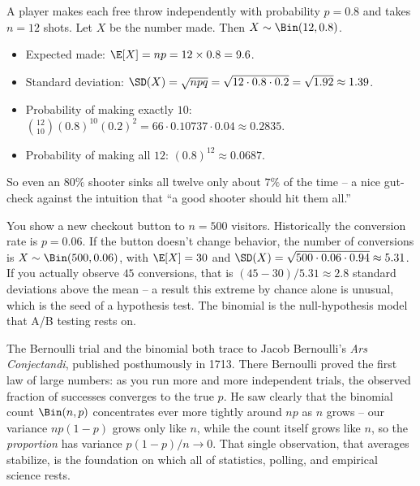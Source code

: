 \begin{example}
\label{ch07:ex-freethrows}
A player makes each free throw independently with probability $p = 0.8$ and takes
$n = 12$ shots. Let $X$ be the number made. Then $X \sim \Bin(12, 0.8)$.
\begin{itemize}
\item Expected made: $\E[X] = np = 12 \times 0.8 = 9.6$.
\item Standard deviation: $\SD(X) = \sqrt{npq} = \sqrt{12 \cdot 0.8 \cdot 0.2}
  = \sqrt{1.92} \approx 1.39$.
\item Probability of making exactly $10$:
  $\binom{12}{10}(0.8)^{10}(0.2)^{2} = 66 \cdot 0.10737 \cdot 0.04
  \approx 0.2835$.
\item Probability of making all $12$: $(0.8)^{12} \approx 0.0687$.
\end{itemize}
So even an $80\%$ shooter sinks all twelve only about $7\%$ of the time -- a nice
gut-check against the intuition that ``a good shooter should hit them all.''
\end{example}

\begin{example}
\label{ch07:ex-abtest}
You show a new checkout button to $n = 500$ visitors. Historically the conversion
rate is $p = 0.06$. If the button doesn't change behavior, the number of
conversions is $X \sim \Bin(500, 0.06)$, with $\E[X] = 30$ and
$\SD(X) = \sqrt{500 \cdot 0.06 \cdot 0.94} \approx 5.31$. If you actually observe
$45$ conversions, that is
$(45 - 30)/5.31 \approx 2.8$ standard deviations above the mean -- a result this
extreme by chance alone is unusual, which is the seed of a hypothesis test. The
binomial is the null-hypothesis model that A/B testing rests on.
\end{example}

\begin{historybox}
The Bernoulli trial and the binomial both trace to Jacob Bernoulli's
\emph{Ars Conjectandi}, published posthumously in 1713. There Bernoulli proved the
first law of large numbers: as you run more and more independent trials, the
observed fraction of successes converges to the true $p$. He saw clearly that the
binomial count $\Bin(n,p)$ concentrates ever more tightly around $np$ as $n$ grows
-- our variance $np(1-p)$ grows only like $n$, while the count itself grows like
$n$, so the \emph{proportion} has variance $p(1-p)/n \to 0$. That single
observation, that averages stabilize, is the foundation on which all of
statistics, polling, and empirical science rests.
\end{historybox}

